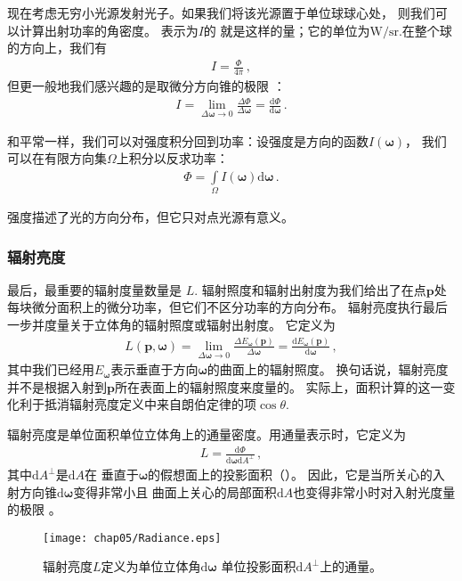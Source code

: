 现在考虑无穷小光源发射光子。如果我们将该光源置于单位球球心处，
则我们可以计算出射功率的角密度。
表示为$I$的
就是这样的量；它的单位为$\text{W}/\text{sr}$.在整个球的方向上，我们有
\begin{align*}
    I=\frac{\varPhi}{4\pi}\, ,
\end{align*}
但更一般地我们感兴趣的是取微分方向锥的极限
：
\begin{align*}
    I=\lim\limits_{\Delta{\bm\omega}\rightarrow 0}{\frac{\Delta\varPhi}{\Delta{\bm\omega}}}=\frac{\mathrm{d}\varPhi}{\mathrm{d}{\bm\omega}}\, .
\end{align*}

和平常一样，我们可以对强度积分回到功率：设强度是方向的函数$I({\bm\omega})$，
我们可以在有限方向集$\Omega$上积分以反求功率：
\begin{align*}
    \varPhi=\int\limits_{\Omega}I({\bm\omega})\mathrm{d}{\bm\omega}\, .
\end{align*}

强度描述了光的方向分布，但它只对点光源有意义。

\subsubsection*{辐射亮度}
最后，最重要的辐射度量数量是
$L$.
辐射照度和辐射出射度为我们给出了在点$\bm p$处
每块微分面积上的微分功率，但它们不区分功率的方向分布。
辐射亮度执行最后一步并度量关于立体角的辐射照度或辐射出射度。
它定义为
\begin{align*}
    L({\bm p},{\bm\omega})=\lim\limits_{\Delta{\bm\omega}\rightarrow 0}{\frac{\Delta E_{\bm\omega}({\bm p})}{\Delta{\bm\omega}}}=\frac{\mathrm{d}E_{\bm\omega}({\bm p})}{\mathrm{d}{\bm\omega}}\, ,
\end{align*}
其中我们已经用$ E_{\bm\omega}$表示垂直于方向$\bm\omega$的曲面上的辐射照度。
换句话说，辐射亮度并不是根据入射到$\bm p$所在表面上的辐射照度来度量的。
实际上，面积计算的这一变化利于抵消辐射亮度定义中来自朗伯定律的项$\cos\theta$.

辐射亮度是单位面积单位立体角上的通量密度。用通量表示时，它定义为
\begin{align}\label{eq:5.2}
    L=\frac{\mathrm{d}\varPhi}{\mathrm{d}{\bm\omega}\mathrm{d}A^{\perp}}\, ,
\end{align}
其中$\mathrm{d}A^{\perp}$是$\mathrm{d}A$在
垂直于$\bm\omega$的假想面上的投影面积（）。
因此，它是当所关心的入射方向锥$\mathrm{d}{\bm\omega}$变得非常小且
曲面上关心的局部面积$\mathrm{d}A$也变得非常小时对入射光度量的极限
。
\begin{figure}[htbp]
    \centering\texttt{[image: chap05/Radiance.eps]}
    \caption{辐射亮度$L$定义为单位立体角$\mathrm{d}{\bm\omega}$
    单位投影面积$\mathrm{d}A^{\perp}$上的通量。}
    \label{fig:5.10}
\end{figure}

